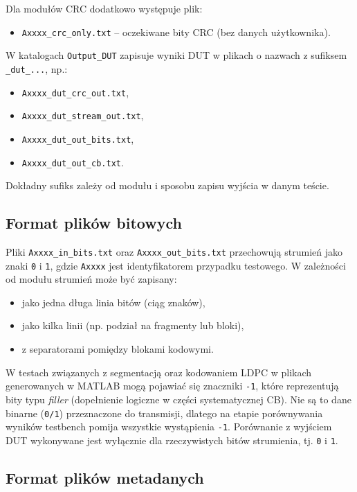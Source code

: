 Dla modułów CRC dodatkowo występuje plik:
\begin{itemize}
    \item \texttt{Axxxx\_crc\_only.txt} -- oczekiwane bity CRC (bez danych użytkownika).
\end{itemize}

W katalogach \texttt{Output\_DUT}  zapisuje wyniki DUT w plikach o nazwach
z sufiksem \texttt{\_dut\_...}, np.:
\begin{itemize}
    \item \texttt{Axxxx\_dut\_crc\_out.txt},
    \item \texttt{Axxxx\_dut\_stream\_out.txt},
    \item \texttt{Axxxx\_dut\_out\_bits.txt},
    \item \texttt{Axxxx\_dut\_out\_cb.txt}.
\end{itemize}
Dokładny sufiks zależy od modułu i sposobu zapisu wyjścia w danym teście.

\subsection{Format plików bitowych}
\label{subsec:wektory_format_bitow}

Pliki \texttt{Axxxx\_in\_bits.txt} oraz \texttt{Axxxx\_out\_bits.txt} przechowują strumień jako
znaki \texttt{0} i \texttt{1}, gdzie \texttt{Axxxx} jest identyfikatorem przypadku testowego.
W zależności od modułu strumień może być zapisany:
\begin{itemize}
    \item jako jedna długa linia bitów (ciąg znaków),
    \item jako kilka linii (np. podział na fragmenty lub bloki),
    \item z separatorami pomiędzy blokami kodowymi.
\end{itemize}

W testach związanych z segmentacją oraz kodowaniem LDPC w plikach generowanych w MATLAB mogą pojawiać się
znaczniki \texttt{-1}, które reprezentują bity typu \emph{filler} (dopełnienie logiczne w części systematycznej CB).
Nie są to dane binarne (\texttt{0/1}) przeznaczone do transmisji, dlatego na etapie porównywania wyników
testbench pomija wszystkie wystąpienia \texttt{-1}. Porównanie z wyjściem DUT wykonywane jest wyłącznie
dla rzeczywistych bitów strumienia, tj. \texttt{0} i \texttt{1}.


\subsection{Format plików metadanych}
\label{subsec:wektory_meta}

